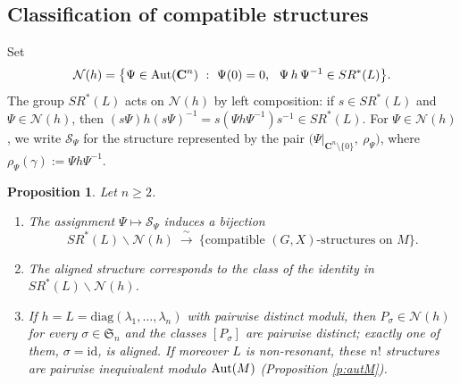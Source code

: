 \documentclass[english,11pt]{amsart}
\newtheorem{proposition}[theorem]{Proposition}
\theoremstyle{definition}
\theoremstyle{remark}
\numberwithin{equation}{section}
\newcommand{\C}{\mathbf{C}}
\newcommand{\Aut}{\mathop{\rm Aut}}
\newcommand{\Norm}{\mathcal{N}}
\newcommand{\Sc}{\mathcal{S}}
\begin{document}
\subsection{Classification of compatible structures}

Set
\[
\Norm(h)=\big\{\Psi\in\Aut(\C^n)\ :\ \Psi(0)=0,\ \ \Psi\, h\,\Psi^{-1}\in SR^*(L)\big\}.
\]
The group $SR^*(L)$ acts on $\Norm(h)$ by left composition: if $s\in SR^*(L)$ and $\Psi\in\Norm(h)$, then $(s\Psi)h(s\Psi)^{-1}=s(\Psi h\Psi^{-1})s^{-1}\in SR^*(L)$. For $\Psi\in\Norm(h)$, we write $\Sc_\Psi$ for the structure represented by the pair $\big(\Psi|_{\C^n\setminus\{0\}},\ \rho_\Psi\big)$, where $\rho_\Psi(\gamma):=\Psi h\Psi^{-1}$.

\begin{proposition}\label{main:classification}
Let $n\geq 2$.
\begin{enumerate}
\item The assignment $\Psi\mapsto\Sc_\Psi$ induces a bijection
\[
SR^*(L)\backslash\Norm(h)\ \xrightarrow{\ \sim\ }\ \big\{\text{compatible $(G,X)$-structures on }M\big\}.
\]
\item The aligned structure corresponds to the class of the identity in $SR^*(L)\backslash\Norm(h)$.
\item If $h=L=\mathrm{diag}(\lambda_1,\dots,\lambda_n)$ with pairwise distinct moduli, then $P_\sigma\in\Norm(h)$ for every $\sigma\in\mathfrak{S}_n$ and the classes $[P_\sigma]$ are pairwise distinct; exactly one of them, $\sigma=\mathrm{id}$, is aligned. If moreover $L$ is non-resonant, these $n!$ structures are pairwise inequivalent modulo $\Aut(M)$ \textup{(}Proposition \ref{p:autM}\textup{)}.
\end{enumerate}
\end{proposition}
\end{document}
